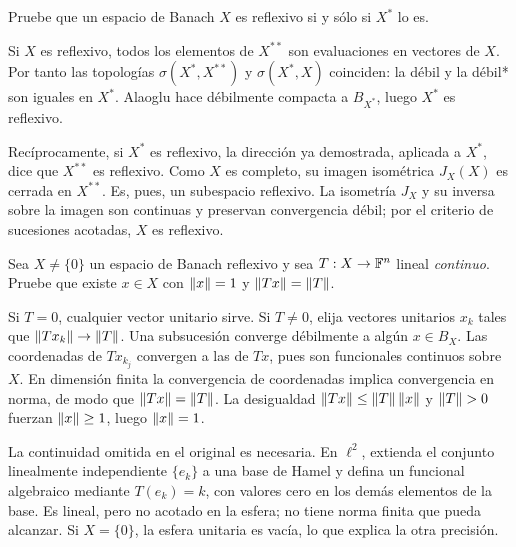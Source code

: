 \begin{ejercicio}\label{ej:v3-l18-2}
Pruebe que un espacio de Banach $X$ es reflexivo si y sólo si $X^*$ lo es.
\end{ejercicio}
\begin{solucion}
Si $X$ es reflexivo, todos los elementos de $X^{**}$ son evaluaciones en vectores de $X$. Por tanto las topologías $\sigma(X^*,X^{**})$ y $\sigma(X^*,X)$ coinciden: la débil y la débil* son iguales en $X^*$. Alaoglu hace débilmente compacta a $B_{X^*}$, luego $X^*$ es reflexivo.

Recíprocamente, si $X^*$ es reflexivo, la dirección ya demostrada, aplicada a $X^*$, dice que $X^{**}$ es reflexivo. Como $X$ es completo, su imagen isométrica $J_X(X)$ es cerrada en $X^{**}$. Es, pues, un subespacio reflexivo. La isometría $J_X$ y su inversa sobre la imagen son continuas y preservan convergencia débil; por el criterio de sucesiones acotadas, $X$ es reflexivo.
\end{solucion}

\begin{ejercicio}\label{ej:v3-l18-3}
Sea $X\ne\{0\}$ un espacio de Banach reflexivo y sea $T:X\to\mathbb F^n$ lineal \emph{continuo}. Pruebe que existe $x\in X$ con $\left\lVert x\right\rVert=1$ y $\left\lVert Tx\right\rVert=\left\lVert T\right\rVert$.
\end{ejercicio}
\begin{solucion}
Si $T=0$, cualquier vector unitario sirve. Si $T\ne0$, elija vectores unitarios $x_k$ tales que $\left\lVert Tx_k\right\rVert\to\left\lVert T\right\rVert$. Una subsucesión converge débilmente a algún $x\in B_X$. Las coordenadas de $Tx_{k_j}$ convergen a las de $Tx$, pues son funcionales continuos sobre $X$. En dimensión finita la convergencia de coordenadas implica convergencia en norma, de modo que $\left\lVert Tx\right\rVert=\left\lVert T\right\rVert$. La desigualdad $\left\lVert Tx\right\rVert\leq\left\lVert T\right\rVert\left\lVert x\right\rVert$ y $\left\lVert T\right\rVert>0$ fuerzan $\left\lVert x\right\rVert\geq1$, luego $\left\lVert x\right\rVert=1$.

La continuidad omitida en el original es necesaria. En $\ell^2$, extienda el conjunto linealmente independiente $\{e_k\}$ a una base de Hamel y defina un funcional algebraico mediante $T(e_k)=k$, con valores cero en los demás elementos de la base. Es lineal, pero no acotado en la esfera; no tiene norma finita que pueda alcanzar. Si $X=\{0\}$, la esfera unitaria es vacía, lo que explica la otra precisión.
\end{solucion}

